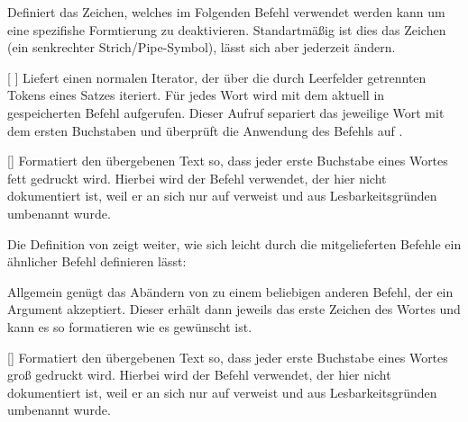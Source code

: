 %
%
%

Definiert das Zeichen, welches im Folgenden Befehl verwendet werden kann um eine spezifishe Formtierung zu deaktivieren. Standartmäßig ist dies das Zeichen \T{|} (ein senkrechter Strich/Pipe-Symbol), lässt sich aber jederzeit ändern.

%
%
%

[ ]
Liefert einen normalen Iterator, der über die durch Leerfelder getrennten Tokens eines Satzes iteriert. Für jedes Wort wird  mit dem aktuell in  gespeicherten Befehl aufgerufen. Dieser Aufruf separiert das jeweilige Wort mit dem ersten Buchstaben und überprüft die Anwendung des Befehls auf .

%
%
%

[]
Formatiert den übergebenen Text so, dass jeder erste Buchstabe eines Wortes fett gedruckt wird. Hierbei wird der Befehl  verwendet, der hier nicht dokumentiert ist, weil er an sich nur auf  verweist und aus Lesbarkeitsgründen umbenannt wurde.
\begin{latex*}
\end{latex*}
Die Definition von  zeigt weiter, wie sich leicht durch die mitgelieferten Befehle ein ähnlicher Befehl definieren lässt:
Allgemein genügt das Abändern von  zu einem beliebigen anderen Befehl, der ein Argument akzeptiert. Dieser erhält dann jeweils das erste Zeichen des Wortes und kann es so formatieren wie es gewünscht ist.

%
%
%

[]
Formatiert den übergebenen Text so, dass jeder erste Buchstabe eines Wortes groß gedruckt wird. Hierbei wird der Befehl  verwendet, der hier nicht dokumentiert ist, weil er an sich nur auf  verweist und aus Lesbarkeitsgründen umbenannt wurde.
\begin{latex*}
\end{latex*}

